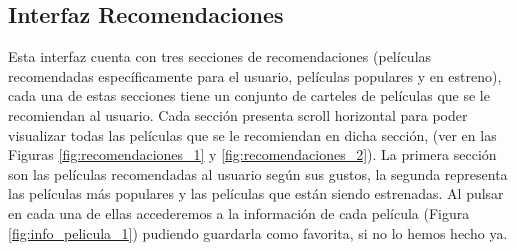 \subsection{Interfaz Recomendaciones}
\label{makereference3.4.6}
Esta interfaz cuenta con tres secciones de recomendaciones (películas recomendadas específicamente para el usuario, películas populares y en estreno), cada una de estas secciones tiene un conjunto de carteles de 
películas que se le recomiendan al usuario.  Cada sección presenta scroll horizontal para poder
visualizar todas las películas que se le recomiendan en dicha sección, (ver en las Figuras \ref{fig:recomendaciones_1} y \ref{fig:recomendaciones_2}). La primera sección son las películas recomendadas al usuario según 
sus gustos, la segunda representa las películas más populares
y las películas que están siendo estrenadas. Al pulsar en cada una de ellas accederemos a la información de cada película (Figura \ref{fig:info_pelicula_1}) pudiendo guardarla como favorita, si no lo hemos hecho ya.
